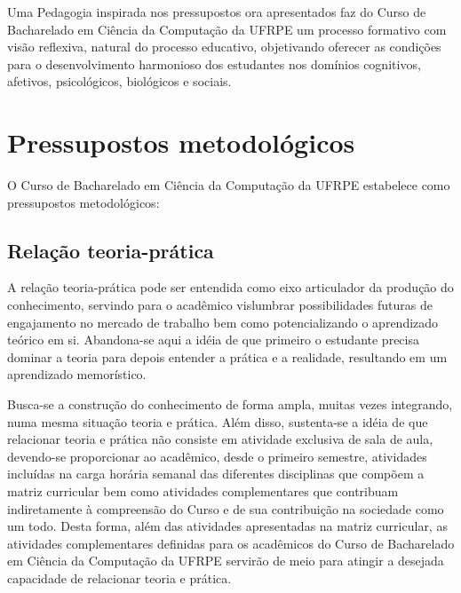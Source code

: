 \documentclass[
	12pt,				%
	openright,			%
  oneside,     %
	a4paper,			%
	english,			%
	french,				%
	spanish,			%
	brazil				%
	]{abntex2}
\begin{document}
Uma Pedagogia inspirada nos pressupostos ora apresentados faz do Curso de
Bacharelado em Ciência da Computação da UFRPE um processo formativo com visão
reflexiva, natural do processo educativo, objetivando oferecer as condições para
o desenvolvimento harmonioso dos estudantes nos domínios cognitivos, afetivos,
psicológicos, biológicos e sociais.




%
%




\chapter{Pressupostos metodológicos}

O Curso de Bacharelado em Ciência da Computação da UFRPE estabelece como
pressupostos metodológicos: 

\section{Relação teoria-prática}

A relação teoria-prática pode ser entendida como eixo articulador da produção do
conhecimento, servindo para o acadêmico vislumbrar possibilidades futuras de engajamento no mercado de
trabalho bem como potencializando o aprendizado teórico em si. Abandona-se aqui
a idéia de que primeiro o estudante precisa dominar a teoria para depois
entender a prática e a realidade, resultando em um aprendizado memorístico.

Busca-se a construção do conhecimento de forma ampla, muitas vezes integrando,
numa mesma situação teoria e prática. Além disso, sustenta-se a idéia de que
relacionar teoria e prática não consiste em atividade exclusiva de sala de aula,
devendo-se proporcionar ao acadêmico, desde o primeiro semestre, atividades
incluídas na carga horária semanal das diferentes disciplinas que compõem a
matriz curricular bem como atividades complementares que contribuam
indiretamente à compreensão do Curso e de sua contribuição na sociedade como um
todo. Desta forma, além das atividades apresentadas na matriz curricular, as
atividades complementares definidas para os acadêmicos do Curso de Bacharelado
em Ciência da Computação da UFRPE servirão de meio para atingir a desejada
capacidade de relacionar teoria e prática. 
\end{document}
